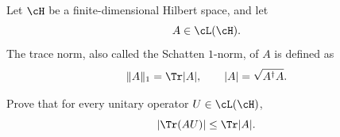 Let $\cH$ be a finite-dimensional Hilbert space, and let
$$
A\in \cL(\cH).
$$
The trace norm, also called the Schatten $1$-norm, of $A$ is defined as
$$
\|A\|_1=\Tr|A|,
\qquad
|A|=\sqrt{A^\dagger A}.
$$

Prove that for every unitary operator $U\in \cL(\cH)$,
$$
\left|\Tr(AU)\right|
\leq
\Tr|A|.
$$
